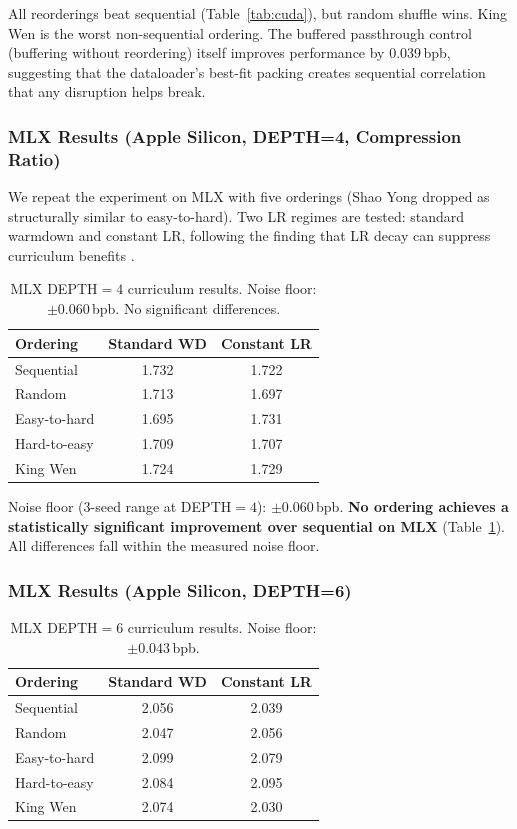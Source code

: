 \documentclass{article}
\begin{document}
All reorderings beat sequential (Table~\ref{tab:cuda}), but random shuffle wins. King Wen is the worst non-sequential ordering. The buffered passthrough control (buffering without reordering) itself improves performance by 0.039\,bpb, suggesting that the dataloader's best-fit packing creates sequential correlation that any disruption helps break.

\subsubsection{MLX Results (Apple Silicon, DEPTH=4, Compression Ratio)}

We repeat the experiment on MLX with five orderings (Shao Yong dropped as structurally similar to easy-to-hard). Two LR regimes are tested: standard warmdown and constant LR, following the finding that LR decay can suppress curriculum benefits \cite{luo2025lrdecay}.

\begin{table}[h]
\centering
\begin{tabular}{lcc}
\toprule
\textbf{Ordering} & \textbf{Standard WD} & \textbf{Constant LR} \\
\midrule
Sequential & 1.732 & 1.722 \\
Random & 1.713 & 1.697 \\
Easy-to-hard & 1.695 & 1.731 \\
Hard-to-easy & 1.709 & 1.707 \\
King Wen & 1.724 & 1.729 \\
\bottomrule
\end{tabular}
\caption{MLX DEPTH${}=4$ curriculum results. Noise floor: $\pm 0.060$\,bpb. No significant differences.}
\label{tab:mlx4}
\end{table}

Noise floor (3-seed range at DEPTH${}=4$): $\pm 0.060$\,bpb. \textbf{No ordering achieves a statistically significant improvement over sequential on MLX} (Table~\ref{tab:mlx4}). All differences fall within the measured noise floor.

\subsubsection{MLX Results (Apple Silicon, DEPTH=6)}

\begin{table}[h]
\centering
\begin{tabular}{lcc}
\toprule
\textbf{Ordering} & \textbf{Standard WD} & \textbf{Constant LR} \\
\midrule
Sequential & 2.056 & 2.039 \\
Random & 2.047 & 2.056 \\
Easy-to-hard & 2.099 & 2.079 \\
Hard-to-easy & 2.084 & 2.095 \\
King Wen & 2.074 & 2.030 \\
\bottomrule
\end{tabular}
\caption{MLX DEPTH${}=6$ curriculum results. Noise floor: $\pm 0.043$\,bpb.}
\label{tab:mlx6}
\end{table}
\end{document}
